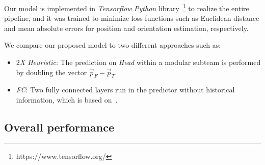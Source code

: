 \documentclass[letterpaper, 10 pt, conference]{ieeeconf}  %
\begin{document}
    Our model is implemented in \emph{Tensorflow} \emph{Python}
    library~\footnote{https://www.tensorflow.org/} to realize the entire
    pipeline, and it was trained to minimize loss functions such as
    Euclidean distance and mean absolute errors for position and
    orientation estimation, respectively.

	We compare our proposed model to two different approaches such as:
	\begin{itemize}
		\item \emph{$2$X Heuristic}:
            The prediction on \emph{Head} within a modular subteam is
            performed by doubling the vector $\vec{p}_{F} -
            \vec{p}_{T}$.

		\item \emph{FC}:
            Two fully connected layers run in the predictor without
            historical information, which is based on~\cite{CPR17}.

	\end{itemize}




	\subsection{Overall performance}
	\label{sec:overall_performance}
\end{document}
